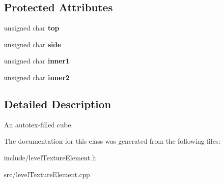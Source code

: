 \subsection*{\-Protected \-Attributes}
\begin{DoxyCompactItemize}
\item 
\hypertarget{classLevelTextureElementAutotexCube_aad1cc6790265bd6e2be03f25252f059d}{
unsigned char {\bfseries top}}
\label{dc/d4e/classLevelTextureElementAutotexCube_aad1cc6790265bd6e2be03f25252f059d}

\item 
\hypertarget{classLevelTextureElementAutotexCube_ab5c51747e46ef52f9e09eaf0fe4ee3a8}{
unsigned char {\bfseries side}}
\label{dc/d4e/classLevelTextureElementAutotexCube_ab5c51747e46ef52f9e09eaf0fe4ee3a8}

\item 
\hypertarget{classLevelTextureElementAutotexCube_af60726e08bc7a1e4985075b04acc2583}{
unsigned char {\bfseries inner1}}
\label{dc/d4e/classLevelTextureElementAutotexCube_af60726e08bc7a1e4985075b04acc2583}

\item 
\hypertarget{classLevelTextureElementAutotexCube_a56578fa8cf0ca11ae758500849a82168}{
unsigned char {\bfseries inner2}}
\label{dc/d4e/classLevelTextureElementAutotexCube_a56578fa8cf0ca11ae758500849a82168}

\end{DoxyCompactItemize}


\subsection{\-Detailed \-Description}
\-An autotex-\/filled cube. 

\-The documentation for this class was generated from the following files\-:\begin{DoxyCompactItemize}
\item 
include/level\-Texture\-Element.\-h\item 
src/level\-Texture\-Element.\-cpp\end{DoxyCompactItemize}
